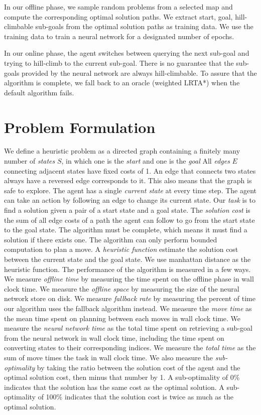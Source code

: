 \documentclass[letterpaper]{article}
\numberwithin{equation}{section}
\numberwithin{theorem}{section}
\numberwithin{lemma}{section}
\numberwithin{df}{section}
\begin{document}
    In our offline phase, we sample random problems from a selected map and compute the corresponding optimal solution paths.
    We extract start, goal, hill-climbable sub-goals from the optimal solution paths as training data.
    We use the training data to train a neural network for a designated number of epochs.

    In our online phase, the agent switches between querying the next sub-goal and trying to hill-climb to the current sub-goal.
    There is no guarantee that the sub-goals provided by the neural network are always hill-climbable.
    To assure that the algorithm is complete, we fall back to an oracle (weighted LRTA*) when the default algorithm fails.

    \section{Problem Formulation}\label{sec:problem-formulation}

    We define a heuristic problem as a directed graph containing a finitely many number of \textit{states} $S$, in which one is the \textit{start} and one is the \textit{goal}
    All \textit{edges} $E$ connecting adjacent states have fixed costs of 1.
    An edge that connects two states always have a reversed edge corresponds to it.
    This also means that the graph is safe to explore.
    The agent has a single \textit{current state} at every time step.
    The agent can take an action by following an edge to change its current state.
    Our \textit{task} is to find a solution given a pair of a start state and a goal state.
    The \textit{solution cost} is the sum of all edge costs of a path the agent can follow to go from the start state to the goal state.
    The algorithm must be complete, which means it must find a solution if there exists one.
    The algorithm can only perform bounded computation to plan a move.
    A \textit{heuristic function} estimate the solution cost between the current state and the goal state.
    We use manhattan distance as the heuristic function.
    The performance of the algorithm is measured in a few ways.
    We measure \textit{offline time} by measuring the time spent on the offline phase in wall clock time.
    We measure the \textit{offline space} by measuring the size of the neural network store on disk.
    We measure \textit{fallback rate} by measuring the percent of time our algorithm uses the fallback algorithm instead.
    We measure the \textit{move time} as the mean time spent on planning between each moves in wall clock time.
    We measure the \textit{neural network time} as the total time spent on retrieving a sub-goal from the neural network in wall clock time,
    including the time spent on converting states to their corresponding indices.
    We measure the \textit{total time} as the sum of move times the task in wall clock time.
    We also measure the \textit{sub-optimality} by taking the ratio between the solution cost of the agent and the optimal solution cost, then minus that number by 1.
    A sub-optimality of 0\% indicates that the solution has the same cost as the optimal solution.
    A sub-optimality of 100\% indicates that the solution cost is twice as much as the optimal solution.
\end{document}
